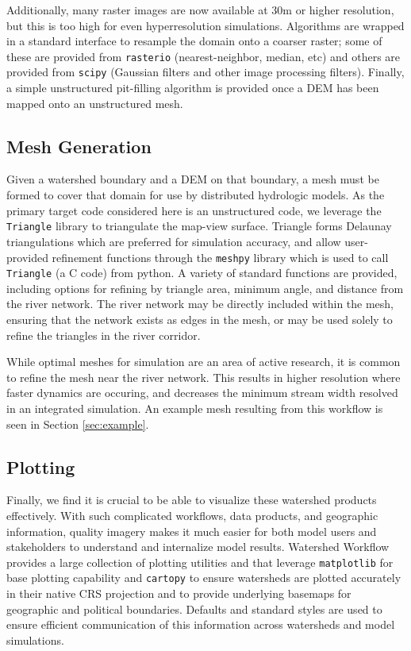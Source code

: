 \documentclass[a4paper,fleqn]{cas-dc}
\newcommand{\code}[1]{\texttt{#1}}
\begin{document}
Additionally, many raster images are now available at 30m or higher resolution, but this is too high for even hyperresolution simulations.
Algorithms are wrapped in a standard interface to resample the domain onto a coarser raster; some of these are provided from \code{rasterio} (nearest-neighbor, median, etc) and others are provided from \code{scipy} (Gaussian filters and other image processing filters).
Finally, a simple unstructured pit-filling algorithm is provided once a DEM has been mapped onto an unstructured mesh.

\subsection{Mesh Generation}
%
Given a watershed boundary and a DEM on that boundary, a mesh must be formed to cover that domain for use by distributed hydrologic models.
As the primary target code considered here is an unstructured code, we leverage the \code{Triangle} library\cite{} to triangulate the map-view surface.
Triangle forms Delaunay triangulations which are preferred for simulation accuracy, and allow user-provided refinement functions through the \code{meshpy} library which is used to call \code{Triangle} (a C code) from python.
A variety of standard functions are provided, including options for refining by triangle area, minimum angle, and distance from the river network.
The river network may be directly included within the mesh, ensuring that the network exists as edges in the mesh, or may be used solely to refine the triangles in the river corridor.

While optimal meshes for simulation are an area of active research\cite{ozgur2020??}, it is common to refine the mesh near the river network.
This results in higher resolution where faster dynamics are occuring, and decreases the minimum stream width resolved in an integrated simulation.
An example mesh resulting from this workflow is seen in Section \ref{sec:example}.

\subsection{Plotting}
%
Finally, we find it is crucial to be able to visualize these watershed products effectively.
With such complicated workflows, data products, and geographic information, quality imagery makes it much easier for both model users and stakeholders to understand and internalize model results.
Watershed Workflow provides a large collection of plotting utilities and that leverage \code{matplotlib}\cite{} for base plotting capability and \code{cartopy} to ensure watersheds are plotted accurately in their native CRS projection and to provide underlying basemaps for geographic and political boundaries.
Defaults and standard styles are used to ensure efficient communication of this information across watersheds and model simulations.
\end{document}
